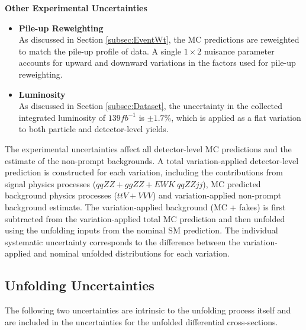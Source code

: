 \textbf{Other Experimental Uncertainties }\\
\begin{itemize}
    \item{\textbf{Pile-up Reweighting}\\ As discussed in Section \ref{subsec:EventWt}, the MC predictions are reweighted to match the pile-up profile of data. A single $1\times2$ nuisance parameter accounts for upward and downward variations in the factors used for pile-up reweighting. }
    \item{\textbf{Luminosity}\\ As discussed in Section \ref{subsec:Dataset}, the uncertainty in the collected integrated luminosity of $139 fb^{-1}$ is $\pm1.7\%$, which is applied as a flat variation to both particle and detector-level yields. } 
\end{itemize}

The experimental uncertainties affect all detector-level MC predictions and the estimate of the non-prompt backgrounds. A total variation-applied detector-level prediction is constructed for each variation, including the contributions from signal physics processes ($qqZZ+ggZZ+EWK~qqZZjj$), MC predicted background physics processes ($ttV+VVV$) and variation-applied non-prompt background estimate. The variation-applied background (MC + fakes) is first subtracted from the variation-applied total MC prediction and then unfolded using the unfolding inputs from the nominal SM prediction. The individual systematic uncertainty corresponds to the difference between the variation-applied and nominal unfolded distributions for each variation.  

\subsection{Unfolding Uncertainties}
\label{subsec:UnfoldingUnc}
The following two uncertainties are intrinsic to the unfolding process itself and are included in the uncertainties for the unfolded differential cross-sections.

